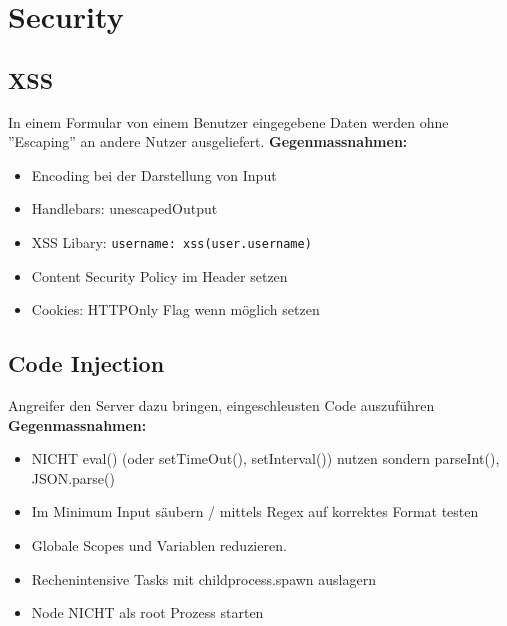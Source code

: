 
\section{Security}


\subsection{XSS}
In einem Formular von einem Benutzer eingegebene Daten werden ohne ''Escaping'' an andere Nutzer ausgeliefert.
\textbf{Gegenmassnahmen:}
\begin{itemize}
    \item Encoding bei der Darstellung von Input
    \item Handlebars: {{{unescapedOutput}}}
    \item XSS Libary: \texttt{username: xss(user.username)}
    \item Content Security Policy im Header setzen
    \item Cookies: HTTPOnly Flag wenn möglich setzen
\end{itemize}


\subsection{Code Injection}
Angreifer den Server dazu bringen, eingeschleusten Code auszuführen
\textbf{Gegenmassnahmen:}
\begin{itemize}
    \item NICHT eval() (oder setTimeOut(), setInterval()) nutzen sondern parseInt(), JSON.parse()
    \item Im Minimum Input säubern / mittels Regex auf korrektes Format testen
    \item Globale Scopes und Variablen reduzieren.
    \item Rechenintensive Tasks mit childprocess.spawn auslagern
    \item Node NICHT als root Prozess starten
\end{itemize}


